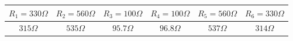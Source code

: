 \begin{tabular}{ | c | c | c | c | c | c | } \hline
	$R_1 = 330 \Omega$ & $R_2 = 560 \Omega$ & $R_3 = 100 \Omega$ & $R_4 = 100 \Omega$ & $R_5 = 560 \Omega$ & $R_6 = 330 \Omega$ \\ \hline
	$315 \Omega$ & $535 \Omega$ & $95.7 \Omega$ & $96.8 \Omega$ & $537 \Omega$ & $314 \Omega$ \\ \hline
\end{tabular}